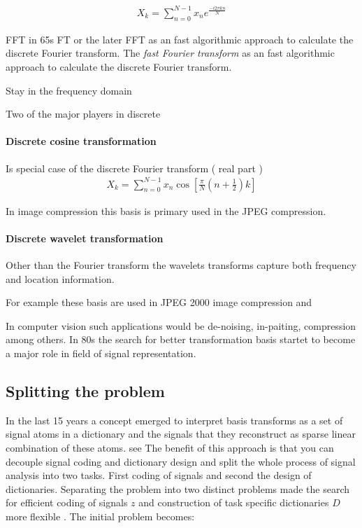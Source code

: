\begin{align*}
 X_k = \sum_{n=0}^{N-1}x_ne^{\frac{-i2\pi kn}{N}}
\end{align*}

FFT in 65s
FT or the later FFT as an fast algorithmic approach to calculate the discrete
Fourier transform.
The \emph{fast Fourier transform}  as an fast algorithmic approach to calculate
the discrete Fourier transform.



Stay in the frequency domain

Two of the major players in discrete 

\paragraph{Discrete cosine transformation}
Is special case of the discrete Fourier transform ( real part )
\begin{align*}
X_k = \sum_{n=0}^{N-1}x_n\cos \left[ \frac{\pi}{N} \left(
n+\frac{1}{2}\right) k\right]
\end{align*}
\Todo{}

In image compression this basis is primary used in the JPEG compression.


\paragraph{Discrete wavelet transformation}
\Todo{}
Other than the Fourier transform the wavelets transforms capture both frequency
and location information.

For example these basis are used in JPEG 2000 image compression and 

In computer vision such applications would be de-noising, in-paiting,
compression among others. In 80s the search for better transformation basis
startet to become a major role in field of signal representation.\cite{}


\subsection{Splitting the problem}
\cite{Rubinstein2010}
In the last 15 years a concept emerged to interpret basis transforms as a set of
signal atoms in a dictionary and the signals that they reconstruct as sparse
linear combination of these atoms. see\cite{Olshausen1996,Mallat1993} The
benefit of this approach is that you can decouple signal coding and dictionary
design and split the whole process of signal analysis into two tasks. First
coding of signals and second the design of dictionaries. Separating the problem
into two distinct problems made the search for efficient coding of signals $z$
and construction of task specific dictionaries $D$ more flexible \cite{?}. The
initial problem becomes:

